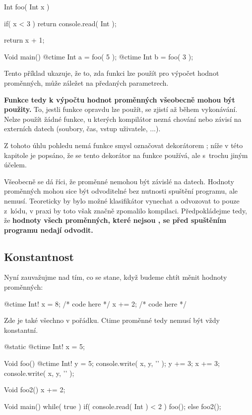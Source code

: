 \begin{code}
Int foo( Int x ) {
	if( x < 3 )
		return console.read( Int );

	return x + 1;
}

Void main() {
	@ctime Int a = foo( 5 );
	@ctime Int b = foo( 3 );
}
\end{code}

Tento příklad ukazuje, že to, zda funkci lze použít pro výpočet hodnot \ctime proměnných, může záležet na předaných parametrech.

\textbf{Funkce tedy k výpočtu hodnot \ctime proměnných všeobecně mohou být použity.} To, jestli funkce opravdu lze použít, se zjistí až během vykonávání. Nelze použít žádné funkce, u kterých kompilátor nezná chování nebo závisí na externích datech (soubory, čas, vstup uživatele, ...).

Z tohoto úhlu pohledu nemá funkce smysl označovat dekorátorem ; níže v této kapitole je popsáno, že se tento dekorátor na funkce používá, ale s~trochu jiným účelem.

Všeobecně se dá říci, že \ctime proměnné nemohou být závislé na \nonctime datech. Hodnoty \nonctime proměnných mohou sice být odvoditelné bez nutnosti spuštění programu, ale nemusí. Teoreticky by bylo možné klasifikátor vynechat a odvozovat to pouze z~kódu, v praxi by toto však značně zpomalilo kompilaci. Předpokládejme tedy, že \textbf{hodnoty všech proměnných, které nejsou \ctime, se před spuštěním programu nedají odvodit.}

\subsection{Konstantnost}
Nyní zauvažujme nad tím, co se stane, když budeme chtít měnit hodnoty \ctime proměnných:

\begin{code}
@ctime Int! x = 8;
/* code here */
x += 2;
/* code here */
\end{code}

Zde je také všechno v pořádku. Ctime proměnné tedy nemusí být vždy konstantní.

\begin{code}
@static @ctime Int! x = 5;

Void foo() {
	@ctime Int! y = 5;
	console.write( x, y, '\n' );
	y += 3;
	x += 3;
	console.write( x, y, '\n' );
}

Void foo2() {
	x += 2;
}

Void main() {
	while( true ) {
		if( console.read( Int ) < 2 )
			foo();
		else
			foo2();
	}
}
\end{code}

